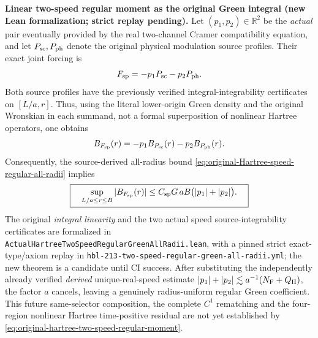 \documentclass[11pt]{amsart}
\begin{document}
\medskip
\noindent\textbf{Linear two-speed regular moment as the original Green integral
(new Lean formalization; strict replay pending).}
Let $(p_1,p_2)\in\mathbb R^2$ be the \emph{actual} pair eventually
provided by the real two-channel Cramer compatibility equation, and
let $P_{\rm sc},P_{\rm ph}$ denote the original physical modulation
source profiles.  Their exact joint forcing is
\[
 F_{\rm sp}=-p_1P_{\rm sc}-p_2P_{\rm ph}.
\]
Both source profiles have the previously verified integral-integrability
certificates on $[L/a,r]$.  Thus, using the literal lower-origin Green
density and the original Wronskian in each summand, not a formal
superposition of nonlinear Hartree operators, one obtains
\[
 B_{F_{\rm sp}}(r)
   =-p_1 B_{P_{\rm sc}}(r)-p_2 B_{P_{\rm ph}}(r).
\]
Consequently, the source-derived all-radius bound
\eqref{eq:original-Hartree-speed-regular-all-radii} implies
\begin{equation}
 \boxed{\quad
 \sup_{L/a\le r\le B}|B_{F_{\rm sp}}(r)|
 \le C_{\rm sp}G\,aB\bigl(|p_1|+|p_2|\bigr).
 \quad}
 \label{eq:original-hartree-two-speed-regular-moment}
\end{equation}
The original \emph{integral linearity} and the two actual speed
source-integrability certificates are formalized in
\texttt{ActualHartreeTwoSpeedRegularGreenAllRadii.lean}, with
a pinned strict exact-type/axiom replay in
\texttt{hbl-213-two-speed-regular-green-all-radii.yml};
the new theorem is a candidate until CI success.  After substituting
the independently already verified \emph{derived} unique-real-speed
estimate $|p_1|+|p_2|\lesssim a^{-1}(N_{\rm F}+Q_{\rm H})$,
the factor $a$ cancels, leaving a genuinely radius-uniform
regular Green coefficient.  This future same-selector composition,
the complete $C^1$ rematching and the four-region nonlinear Hartree
time-positive residual are not yet established by
\eqref{eq:original-hartree-two-speed-regular-moment}.
\end{document}
